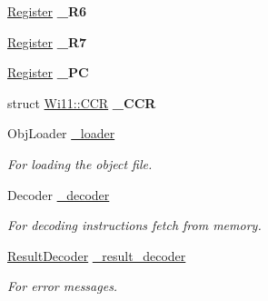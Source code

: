 \begin{DoxyCompactItemize}
\item 
\hypertarget{classWi11_af45f08232aa903851a295b5259f18905}{
\hyperlink{classRegister}{Register} {\bfseries \_\-R6}}
\label{classWi11_af45f08232aa903851a295b5259f18905}

\item 
\hypertarget{classWi11_a0515ac512e8f8e3a122695f823d3abd7}{
\hyperlink{classRegister}{Register} {\bfseries \_\-R7}}
\label{classWi11_a0515ac512e8f8e3a122695f823d3abd7}

\item 
\hypertarget{classWi11_af60b1a832f564e3ac52b4edf7edc8c9a}{
\hyperlink{classRegister}{Register} {\bfseries \_\-PC}}
\label{classWi11_af60b1a832f564e3ac52b4edf7edc8c9a}

\item 
\hypertarget{classWi11_a84cb35829890fca6122c023229007002}{
struct \hyperlink{structWi11_1_1CCR}{Wi11::CCR} {\bfseries \_\-CCR}}
\label{classWi11_a84cb35829890fca6122c023229007002}

\item 
\hypertarget{classWi11_a22efbed824867b4f355062a31f93d8e2}{
ObjLoader \hyperlink{classWi11_a22efbed824867b4f355062a31f93d8e2}{\_\-loader}}
\label{classWi11_a22efbed824867b4f355062a31f93d8e2}

\begin{DoxyCompactList}\small\item\em For loading the object file. \item\end{DoxyCompactList}\item 
\hypertarget{classWi11_a145d0e52ef8bfd21d7b5a0ff3fea43d1}{
Decoder \hyperlink{classWi11_a145d0e52ef8bfd21d7b5a0ff3fea43d1}{\_\-decoder}}
\label{classWi11_a145d0e52ef8bfd21d7b5a0ff3fea43d1}

\begin{DoxyCompactList}\small\item\em For decoding instructions fetch from memory. \item\end{DoxyCompactList}\item 
\hypertarget{classWi11_a18515d6caafb4aba3d8a9220b4ac227e}{
\hyperlink{classResultDecoder}{ResultDecoder} \hyperlink{classWi11_a18515d6caafb4aba3d8a9220b4ac227e}{\_\-result\_\-decoder}}
\label{classWi11_a18515d6caafb4aba3d8a9220b4ac227e}

\begin{DoxyCompactList}\small\item\em For error messages. \item\end{DoxyCompactList}\end{DoxyCompactItemize}


